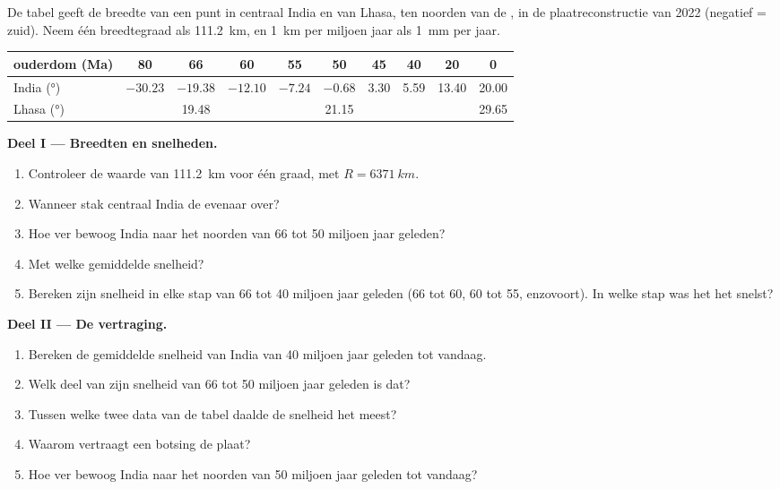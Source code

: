 \begin{problem}
\label{pb:g12:mountain-building:1}
De tabel geeft de breedte van een punt in centraal India en van Lhasa,
ten noorden van de , in de plaatreconstructie van 2022 (negatief = zuid).
Neem één breedtegraad als \qty{111.2}{km}, en \qty{1}{km} per miljoen
jaar als \qty{1}{mm} per jaar.

\begin{center}
\small
\begin{tabular}{|l|c|c|c|c|c|c|c|c|c|}
\hline
ouderdom (\unit{Ma}) & 80 & 66 & 60 & 55 & 50 & 45 & 40 & 20 & 0 \\ \hline
India (\unit{\degree}) & $-30.23$ & $-19.38$ & $-12.10$ & $-7.24$ & $-0.68$ & 3.30 & 5.59 & 13.40 & 20.00 \\ \hline
Lhasa (\unit{\degree}) & & 19.48 & & & 21.15 & & & & 29.65 \\ \hline
\end{tabular}
\end{center}

\medskip
\noindent\textbf{Deel I --- Breedten en snelheden.}
\begin{enumerate}
  \item Controleer de waarde van \qty{111.2}{km} voor één graad, met $R =
        \qty{6371}{km}$.
  \item Wanneer stak centraal India de evenaar over?
  \item Hoe ver bewoog India naar het noorden van 66 tot 50 miljoen jaar geleden?
  \item Met welke gemiddelde snelheid?
  \item Bereken zijn snelheid in elke stap van 66 tot 40 miljoen jaar geleden (66
        tot 60, 60 tot 55, enzovoort). In welke stap was het het snelst?
\end{enumerate}

\medskip
\noindent\textbf{Deel II --- De vertraging.}
\begin{enumerate}[resume]
  \item Bereken de gemiddelde snelheid van India van 40 miljoen jaar geleden tot vandaag.
  \item Welk deel van zijn snelheid van 66 tot 50 miljoen jaar geleden is dat?
  \item Tussen welke twee data van de tabel daalde de snelheid het meest?
  \item Waarom vertraagt een botsing de plaat?
  \item Hoe ver bewoog India naar het noorden van 50 miljoen jaar geleden tot vandaag?
\end{enumerate}


\end{problem}
